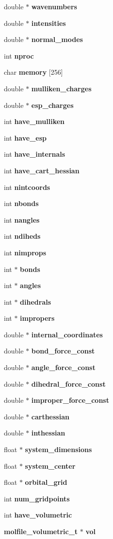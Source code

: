 \begin{CompactItemize}
\item 
double $\ast$ {\bf wavenumbers}
\item 
double $\ast$ {\bf intensities}
\item 
double $\ast$ {\bf normal\_\-modes}
\item 
int {\bf nproc}
\item 
char {\bf memory} [256]
\item 
double $\ast$ {\bf mulliken\_\-charges}
\item 
double $\ast$ {\bf esp\_\-charges}
\item 
int {\bf have\_\-mulliken}
\item 
int {\bf have\_\-esp}
\item 
int {\bf have\_\-internals}
\item 
int {\bf have\_\-cart\_\-hessian}
\item 
int {\bf nintcoords}
\item 
int {\bf nbonds}
\item 
int {\bf nangles}
\item 
int {\bf ndiheds}
\item 
int {\bf nimprops}
\item 
int $\ast$ {\bf bonds}
\item 
int $\ast$ {\bf angles}
\item 
int $\ast$ {\bf dihedrals}
\item 
int $\ast$ {\bf impropers}
\item 
double $\ast$ {\bf internal\_\-coordinates}
\item 
double $\ast$ {\bf bond\_\-force\_\-const}
\item 
double $\ast$ {\bf angle\_\-force\_\-const}
\item 
double $\ast$ {\bf dihedral\_\-force\_\-const}
\item 
double $\ast$ {\bf improper\_\-force\_\-const}
\item 
double $\ast$ {\bf carthessian}
\item 
double $\ast$ {\bf inthessian}
\item 
float $\ast$ {\bf system\_\-dimensions}
\item 
float $\ast$ {\bf system\_\-center}
\item 
float $\ast$ {\bf orbital\_\-grid}
\item 
int {\bf num\_\-gridpoints}
\item 
int {\bf have\_\-volumetric}
\item 
{\bf molfile\_\-volumetric\_\-t} $\ast$ {\bf vol}
\item 

\end{CompactItemize}
